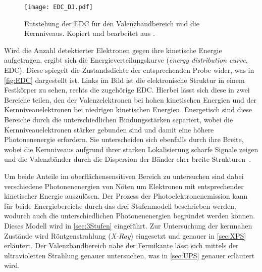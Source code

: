         \begin{figure}
            \centering
            \texttt{[image: EDC\_DJ.pdf]}
            \caption{Entstehung der EDC für den Valenzbandbereich und die Kernniveaus.
            Kopiert und bearbeitet aus \cite{oura_surface_2003}.}
            \label{fig:EDC}
        \end{figure}
        Wird die Anzahl detektierter Elektronen gegen ihre kinetische Energie aufgetragen, ergibt sich die Energieverteilungskurve (\textit{energy distribution curve}, EDC).
        Diese spiegelt die Zustandsdichte der entsprechenden Probe wider, was in \autoref{fig:EDC} dargestellt ist.        
        Links im Bild ist die elektronische Struktur in einem Festkörper zu sehen, rechts die zugehörige EDC.
        Hierbei lässt sich diese in zwei Bereiche teilen, den der Valenzelektronen bei hohen kinetischen Energien und der Kernniveauelektronen bei niedrigen kinetischen Energien.
        Energetisch sind diese Bereiche durch die unterschiedlichen Bindungsstärken separiert, wobei die Kernniveauelektronen stärker gebunden sind und damit eine höhere Photonenenergie erfordern.
        Sie unterscheiden sich ebenfalls durch ihre Breite, wobei die Kernniveaus aufgrund ihrer starken Lokalisierung scharfe Signale zeigen und die Valenzbänder durch die Dispersion der Bänder eher breite Strukturen~\cite{Hüfner}.

        Um beide Anteile im oberflächensensitiven Bereich zu untersuchen sind dabei verschiedene Photonenenergien von Nöten um Elektronen mit entsprechender kinetischer Energie auszulösen.
        Der Prozess der Photoelektronenemission kann für beide Energiebereiche durch das drei Stufenmodell beschrieben werden, wodurch auch die unterschiedlichen Photonenenergien begründet werden können.
        Dieses Modell wird in \autoref{sec:3Stufen} eingeführt.
        Zur Untersuchung der kernnahen Zustände wird Röntgenstrahlung (\textit{X-Ray}) eingesetzt und genauer in \autoref{sec:XPS} erläutert.
        Der Valenzbandbereich nahe der Fermikante lässt sich mittels der ultravioletten Strahlung genauer untersuchen, was in \autoref{sec:UPS} genauer erläutert wird.

